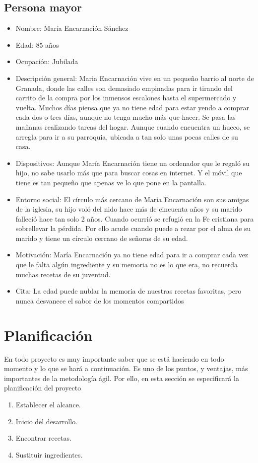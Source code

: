 \subsection{Persona mayor}
\begin{itemize}
    \item Nombre: María Encarnación Sánchez
    \item Edad: 85 años
    \item Ocupación: Jubilada
    \item Descripción general: Maria Encarnación vive en un pequeño barrio al norte de Granada, donde las calles son demasiado empinadas para ir tirando del carrito de la compra por los inmensos escalones hasta el supermercado y vuelta. Muchos días piensa que ya no tiene edad para estar yendo a comprar cada dos o tres días, aunque no tenga mucho más que hacer. Se pasa las mañanas realizando tareas del hogar. Aunque cuando encuentra un hueco, se arregla para ir a su parroquia, ubicada a tan solo unas pocas calles de su casa.
    \item Dispositivos: Aunque María Encarnación tiene un ordenador que le regaló su hijo, no sabe usarlo más que para buscar cosas en internet. Y el móvil que tiene es tan pequeño que apenas ve lo que pone en la pantalla.
    \item Entorno social: El círculo más cercano de María Encarnación son sus amigas de la iglesia, su hijo voló del nido hace más de cincuenta años y su marido falleció hace tan solo 2 años. Cuando ocurrió se refugió en la Fe cristiana para sobrellevar la pérdida. Por ello acude cuando puede a rezar por el alma de su marido y tiene un círculo cercano de señoras de su edad. 
    \item Motivación: María Encarnación ya no tiene edad para ir a comprar cada vez que le falta algún ingrediente y su memoria no es lo que era, no recuerda muchas recetas de su juventud.
    \item Cita: La edad puede nublar la memoria de nuestras recetas favoritas, pero nunca desvanece el sabor de los momentos compartidos
\end{itemize}

\section{Planificación}
En todo proyecto es muy importante saber que se está haciendo en todo momento y lo que se hará a continuación. Es uno de los puntos, y ventajas, más importantes de la metodología ágil. Por ello, en esta sección se especificará la planificación del proyecto\:
\begin{enumerate}
    \item Establecer el alcance.
    \item Inicio del desarrollo.
    \item Encontrar recetas.
    \item Sustituir ingredientes.
\end{enumerate}


